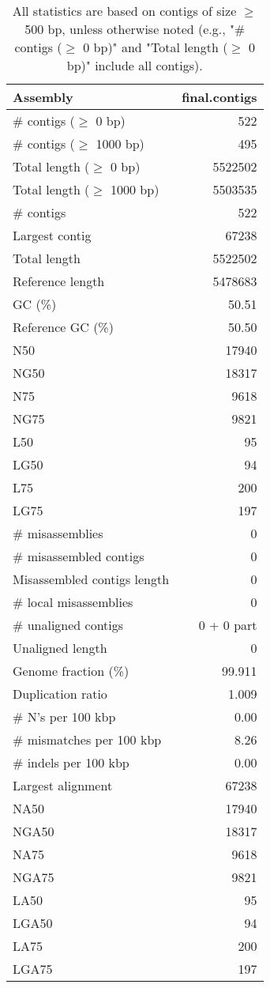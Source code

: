 \documentclass[12pt,a4paper]{article}
\begin{document}
\begin{table}[ht]
\begin{center}
\caption{All statistics are based on contigs of size $\geq$ 500 bp, unless otherwise noted (e.g., "\# contigs ($\geq$ 0 bp)" and "Total length ($\geq$ 0 bp)" include all contigs).}
\begin{tabular}{|l*{1}{|r}|}
\hline
Assembly & final.contigs \\ \hline
\# contigs ($\geq$ 0 bp) & 522 \\ \hline
\# contigs ($\geq$ 1000 bp) & 495 \\ \hline
Total length ($\geq$ 0 bp) & 5522502 \\ \hline
Total length ($\geq$ 1000 bp) & 5503535 \\ \hline
\# contigs & 522 \\ \hline
Largest contig & 67238 \\ \hline
Total length & 5522502 \\ \hline
Reference length & 5478683 \\ \hline
GC (\%) & 50.51 \\ \hline
Reference GC (\%) & 50.50 \\ \hline
N50 & 17940 \\ \hline
NG50 & 18317 \\ \hline
N75 & 9618 \\ \hline
NG75 & 9821 \\ \hline
L50 & 95 \\ \hline
LG50 & 94 \\ \hline
L75 & 200 \\ \hline
LG75 & 197 \\ \hline
\# misassemblies & 0 \\ \hline
\# misassembled contigs & 0 \\ \hline
Misassembled contigs length & 0 \\ \hline
\# local misassemblies & 0 \\ \hline
\# unaligned contigs & 0 + 0 part \\ \hline
Unaligned length & 0 \\ \hline
Genome fraction (\%) & 99.911 \\ \hline
Duplication ratio & 1.009 \\ \hline
\# N's per 100 kbp & 0.00 \\ \hline
\# mismatches per 100 kbp & 8.26 \\ \hline
\# indels per 100 kbp & 0.00 \\ \hline
Largest alignment & 67238 \\ \hline
NA50 & 17940 \\ \hline
NGA50 & 18317 \\ \hline
NA75 & 9618 \\ \hline
NGA75 & 9821 \\ \hline
LA50 & 95 \\ \hline
LGA50 & 94 \\ \hline
LA75 & 200 \\ \hline
LGA75 & 197 \\ \hline
\end{tabular}
\end{center}
\end{table}
\end{document}
